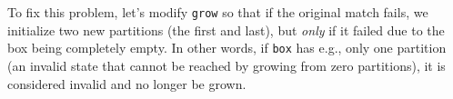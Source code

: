 To fix this problem, let's modify \texttt{grow} so that if the original match fails, we initialize two new partitions (the first and last), but \emph{only} if
it failed due to the box being completely empty. In other words, if \texttt{box} has e.g., only one partition (an invalid state that cannot be reached by
growing from zero partitions), it is considered invalid and no longer be grown.








